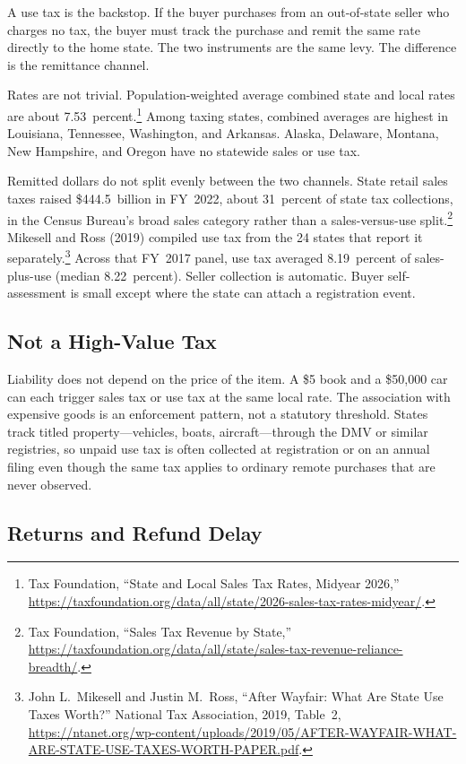 \documentclass[11pt]{article}
\begin{document}
A use tax is the backstop.  If the buyer purchases from an out-of-state seller
who charges no tax, the buyer must track the purchase and remit the same rate
directly to the home state.  The two instruments are the same levy.  The
difference is the remittance channel.

Rates are not trivial.  Population-weighted average combined state and local
rates are about 7.53~percent.\footnote{Tax Foundation, ``State and Local Sales
  Tax Rates, Midyear 2026,''
  \url{https://taxfoundation.org/data/all/state/2026-sales-tax-rates-midyear/}.}
Among taxing states, combined averages are highest in Louisiana, Tennessee,
Washington, and Arkansas.  Alaska, Delaware, Montana, New Hampshire, and
Oregon have no statewide sales or use tax.

Remitted dollars do not split evenly between the two channels.  State retail
sales taxes raised \$444.5~billion in FY~2022, about 31~percent of state tax
collections, in the Census Bureau's broad sales category rather than a
sales-versus-use split.\footnote{Tax Foundation, ``Sales Tax Revenue by
  State,''
  \url{https://taxfoundation.org/data/all/state/sales-tax-revenue-reliance-breadth/}.}
Mikesell and Ross (2019) compiled use tax from the 24 states that report it
separately.\footnote{John L.\ Mikesell and Justin M.\ Ross, ``After Wayfair:
  What Are State Use Taxes Worth?'' National Tax Association, 2019, Table~2,
  \url{https://ntanet.org/wp-content/uploads/2019/05/AFTER-WAYFAIR-WHAT-ARE-STATE-USE-TAXES-WORTH-PAPER.pdf}.}
Across that FY~2017 panel, use tax averaged 8.19~percent of sales-plus-use
(median 8.22~percent).  Seller collection is automatic.  Buyer self-assessment
is small except where the state can attach a registration event.

\subsection{Not a High-Value Tax}

Liability does not depend on the price of the item.  A \$5 book and a \$50,000
car can each trigger sales tax or use tax at the same local rate.  The
association with expensive goods is an enforcement pattern, not a statutory
threshold.  States track titled property---vehicles, boats, aircraft---through
the DMV or similar registries, so unpaid use tax is often collected at
registration or on an annual filing even though the same tax applies to
ordinary remote purchases that are never observed.

\subsection{Returns and Refund Delay}
\end{document}
